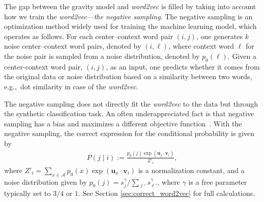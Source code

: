 \documentclass[12pt]{article} %
\def\given{\mid}
\def\eg{e.g.,~}
\begin{document}
The gap between the gravity model and {\it word2vec} is filled by taking into account how we train the \textit{word2vec}---\emph{the negative sampling}.
The negative sampling is an optimization method widely used for training the machine learning model, which operates as follows.
For each center--context word pair $(i,j)$, one generates $k$ noise center--context word pairs, denoted by $(i, \ell)$, where context word $\ell$ for the noise pair is sampled from a noise distribution, denoted by $p_{0}(\ell)$.
Given a center-context word pair, $(i,j)$, as an input, one predicts whether it comes from the original data or noise distribution based on a similarity between two words, \eg dot similarity in case of the \textit{word2vec}.

The negative sampling does not directly fit the \textit{word2vec} to the data but through the synthetic classification task.
An often underappreciated fact is that negative sampling has a bias and maximizes a different objective function~\autocite{Gutmann2010}.
With the negative sampling, the correct expression for the conditional probability is given by
\begin{align}
    P\left(j \given i \right):= \frac{p_0(j)\exp(\bm{u}_j \cdot \bm{v}_{i})}{Z'_i}, \label{eq:prob_w2v_ng0}
\end{align}
where $Z'_i=\sum_{x \in \mathcal{A}} p_0(x) \exp(\bm{u}_{x} \cdot \bm{v}_{i})$ is a normalization constant, and a noise distribution given by $p_{0}(j) = s^{\gamma} _j / \sum_{\ell'} s^{\gamma}_{\ell'}$, where $\gamma$ is a free parameter typically set to $3/4$ or $1$.
See Section \ref{sec:correct_word2vec} for full calculations.
\end{document}
